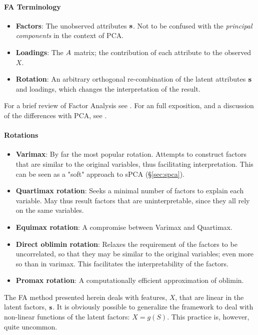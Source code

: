 \paragraph{FA Terminology}
\begin{itemize}
\item \textbf{Factors}: The unobserved attributes $\mathbf{s}$. Not to be confused with the \emph{principal components} in the context of PCA.
\item \textbf{Loadings}: The $A$ matrix; the contribution of each attribute to the observed $X$.
\item \textbf{Rotation}: An arbitrary orthogonal re-combination of the latent attributes $\mathbf{s}$ and loadings, which changes the interpretation of the result.
\end{itemize}


For a brief review of Factor Analysis see \cite{hastie_elements_2003}.
For an full exposition, and a discussion of the differences with PCA, see \cite{jolliffe_principal_2002}.



\paragraph{Rotations}
\begin{itemize}
\item \textbf{Varimax}: By far the most popular rotation. Attempts to construct factors that are similar to the original variables, thus facilitating interpretation. This can be seen as a "soft" approach to sPCA (\S\ref{sec:spca}).
\item \textbf{Quartimax rotation}: Seeks a minimal number of factors to explain each variable. May thus result factors that are uninterpretable, since they all rely on the same variables.
\item \textbf{Equimax rotation}: A compromise between Varimax and Quartimax. 
\item \textbf{Direct oblimin rotation}: Relaxes the requirement of the factors to be uncorrelated, so that they may be similar to the original variables; even more so than in varimax. This facilitates the interpretability of the factors. 
\item \textbf{Promax rotation}: A computationally efficient approximation of oblimin.
\end{itemize}



\begin{remark}
The FA method presented herein deals with features, $X$, that are linear in the latent factors, $\mathbf{s}$. 
It is obviously possible to generalize the framework to deal with non-linear functions of the latent factors: $X=g(S)$. 
This practice is, however, quite uncommon.
\end{remark}


